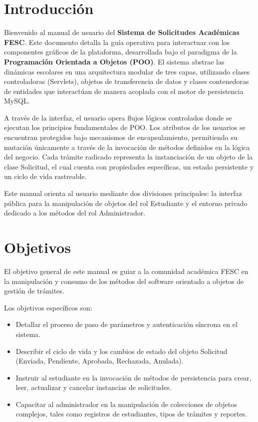 \documentclass[12pt,letterpaper]{article}
\newcommand{\code}[1]{\texorpdfstring{\begingroup\normalfont\normalsize\def\_{\textunderscore\allowbreak}#1\endgroup}{#1}}
\begin{document}
\clearpage
\section*{Introducción}

Bienvenido al manual de usuario del \textbf{Sistema de Solicitudes Académicas FESC}. Este documento detalla la guía operativa para interactuar con los componentes gráficos de la plataforma, desarrollada bajo el paradigma de la \textbf{Programación Orientada a Objetos (POO)}. El sistema abstrae las dinámicas escolares en una arquitectura modular de tres capas, utilizando clases controladoras (Servlets), objetos de transferencia de datos y clases contenedoras de entidades que interactúan de manera acoplada con el motor de persistencia MySQL.

A través de la interfaz, el usuario opera flujos lógicos controlados donde se ejecutan los principios fundamentales de POO. Los atributos de los usuarios se encuentran protegidos bajo mecanismos de encapsulamiento, permitiendo su mutación únicamente a través de la invocación de métodos definidos en la lógica del negocio. Cada trámite radicado representa la instanciación de un objeto de la clase \code{Solicitud}, el cual cuenta con propiedades específicas, un estado persistente y un ciclo de vida rastreable.

Este manual orienta al usuario mediante dos divisiones principales: la interfaz pública para la manipulación de objetos del rol Estudiante y el entorno privado dedicado a los métodos del rol Administrador.

\section{Objetivos}

El objetivo general de este manual es guiar a la comunidad académica FESC en la manipulación y consumo de los métodos del software orientado a objetos de gestión de trámites.

Los objetivos específicos son:
\begin{itemize}
    \item Detallar el proceso de paso de parámetros y autenticación síncrona en el sistema.
    \item Describir el ciclo de vida y los cambios de estado del objeto \code{Solicitud} (Enviada, Pendiente, Aprobada, Rechazada, Anulada).
    \item Instruir al estudiante en la invocación de métodos de persistencia para crear, leer, actualizar y cancelar instancias de solicitudes.
    \item Capacitar al administrador en la manipulación de colecciones de objetos complejos, tales como registros de estudiantes, tipos de trámites y reportes.
\end{itemize}
\end{document}
